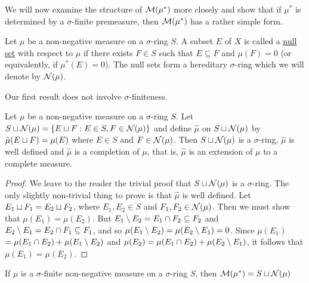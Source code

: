We will now examine the structure of ${\cal M}(\mu^*)$ more closely and show that if $\mu^*$ is determined by a $\sigma$-finite premeasure, then ${\cal M}(\mu^*)$ has a rather simple form.

\begin{definition}
Let $\mu$ be a non-negative measure on a $\sigma$-ring $S$. A subset $E$ of $X$ is called a \underline{null set} with respect to $\mu$ if there exists $F \in S$ such that $E \subseteq F$ and $\mu(F)=0$ (or equivalently, if $\mu^*(E)=0$). The null sets form a hereditary $\sigma$-ring which we will denote by ${\cal N}(\mu)$.
\end{definition}

Our first result does not involve $\sigma$-finiteness.

\begin{proposition}
Let $\mu$ be a non-negative measure on a $\sigma$-ring $S$. Let $S\sqcup{\cal N}(\mu)=\{E\sqcup F: E \in S, F \in {\cal N}(\mu)\}$ and define $\hat{\mu}$ on $S \sqcup {\cal N}(\mu)$ by $\hat{\mu}(E \sqcup F)=\mu(E)$ where $E \in S$ and $F \in {\cal N}(\mu)$. Then $S \sqcup {\cal N}(\mu)$ is a $\sigma$-ring, $\hat{\mu}$ is well defined and $\hat{\mu}$ is a completion of $\mu$, that is, $\hat{\mu}$ is an extension of $\mu$ to a complete measure.
\end{proposition}

\begin{proof}
We leave to the reader the trivial proof that $S\sqcup {\cal N}(\mu)$ is a $\sigma$-ring. The only slightly non-trivial thing to prove is that $\hat{\mu}$ is well defined. Let $E_1 \sqcup F_1=E_2 \sqcup F_2$, where $E_1, E_2 \in S$ and $F_1, F_2 \in {\cal N}(\mu)$. Then we must show that $\mu(E_1)=\mu(E_2)$. But $E_1\setminus E_2=E_1 \cap F_2 \subseteq F_2$ and $E_2\setminus E_1=E_2 \cap F_1 \subseteq F_1$, and so $\mu(E_1\setminus E_2)=\mu(E_2\setminus E_1)=0$. Since $\mu(E_1)$ $=\mu(E_1 \cap E_2)+\mu(E_1\setminus E_2)$ and $\mu(E_2)=\mu(E_1 \cap E_2)+\mu(E_2\setminus E_1)$, it follows that $\mu(E_1)=\mu(E_2)$.

\end{proof}

\begin{theorem}
If $\mu$ is a $\sigma$-finite non-negative measure on a $\sigma$-ring $S$, then ${\cal M}(\mu^*)=S \sqcup {\cal N}(\mu)$
\end{theorem}

